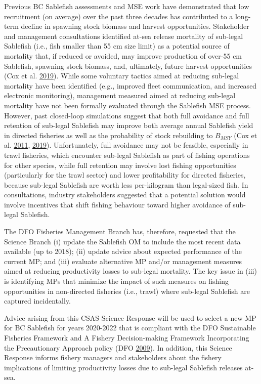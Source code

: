 \documentclass[11pt]{book}
\begin{document}
Previous BC Sablefish assessments and MSE work have demonstrated that low recruitment (on average) over the past three decades has contributed to a long-term decline in spawning stock biomass and harvest opportunities. Stakeholder and management consultations identified at-sea release mortality of sub-legal Sablefish (i.e., fish smaller than 55 cm size limit) as a potential source of mortality that, if reduced or avoided, may improve production of over-55 cm Sablefish, spawning stock biomass, and, ultimately, future harvest opportunities (Cox et al. \protect\hyperlink{ref-cox2019evaluating}{2019}). While some voluntary tactics aimed at reducing sub-legal mortality have been identified (e.g., improved fleet communication, and increased electronic monitoring), management measured aimed at reducing sub-legal mortality have not been formally evaluated through the Sablefish MSE process. However, past closed-loop simulations suggest that both full avoidance and full retention of sub-legal Sablefish may improve both average annual Sablefish yield in directed fisheries as well as the probability of stock rebuilding to \(B_{MSY}\) (Cox et al. \protect\hyperlink{ref-cox2011management}{2011}, \protect\hyperlink{ref-cox2019evaluating}{2019}). Unfortunately, full avoidance may not be feasible, especially in trawl fisheries, which encounter sub-legal Sablefish as part of fishing operations for other species, while full retention may involve lost fishing opportunities (particularly for the trawl sector) and lower profitability for directed fisheries, because sub-legal Sablefish are worth less per-kilogram than legal-sized fish. In consultations, industry stakeholders suggested that a potential solution would involve incentives that shift fishing behaviour toward higher avoidance of sub-legal Sablefish.

The DFO Fisheries Management Branch has, therefore, requested that the Science Branch (i) update the Sablefish OM to include the most recent data available (up to 2018); (ii) update advice about expected performance of the current MP; and (iii) evaluate alternative MP and/or management measures aimed at reducing productivity losses to sub-legal mortality. The key issue in (iii) is identifying MPs that minimize the impact of such measures on fishing opportunities in non-directed fisheries (i.e., trawl) where sub-legal Sablefish are captured incidentally.

Advice arising from this CSAS Science Response will be used to select a new MP for BC Sablefish for years 2020-2022 that is compliant with the DFO Sustainable Fisheries Framework and A Fishery Decision-making Framework Incorporating the Precautionary Approach policy (DFO \protect\hyperlink{ref-DFO2009}{2009}). In addition, this Science Response informs fishery managers and stakeholders about the fishery implications of limiting productivity losses due to sub-legal Sablefish releases at-sea.
\end{document}
